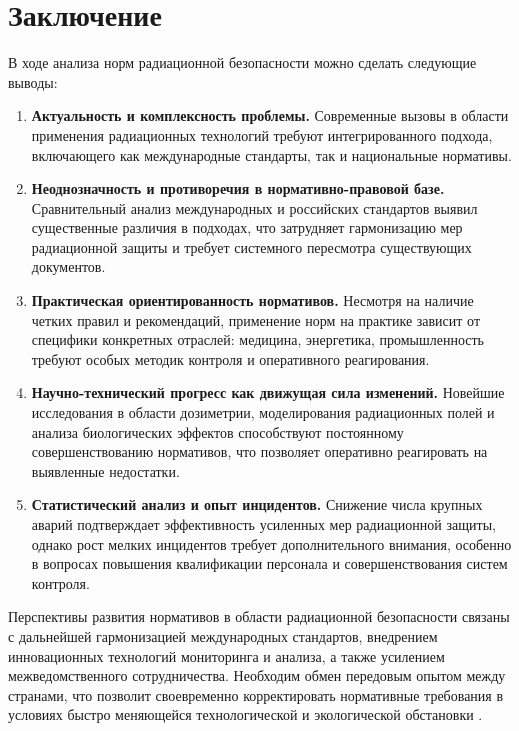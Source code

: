 \documentclass[a4paper, 14pt]{extarticle}
\begin{document}
\section{Заключение}

В ходе анализа норм радиационной безопасности можно сделать следующие выводы:

\begin{enumerate}
    \item \textbf{Актуальность и комплексность проблемы.} Современные вызовы в области применения радиационных технологий требуют интегрированного подхода, включающего как международные стандарты, так и национальные нормативы.

    \item \textbf{Неоднозначность и противоречия в нормативно-правовой базе.} Сравнительный анализ международных и российских стандартов выявил существенные различия в подходах, что затрудняет гармонизацию мер радиационной защиты и требует системного пересмотра существующих документов.

    \item \textbf{Практическая ориентированность нормативов.} Несмотря на наличие четких правил и рекомендаций, применение норм на практике зависит от специфики конкретных отраслей: медицина, энергетика, промышленность требуют особых методик контроля и оперативного реагирования.

    \item \textbf{Научно-технический прогресс как движущая сила изменений.} Новейшие исследования в области дозиметрии, моделирования радиационных полей и анализа биологических эффектов способствуют постоянному совершенствованию нормативов, что позволяет оперативно реагировать на выявленные недостатки.

    \item \textbf{Статистический анализ и опыт инцидентов.} Снижение числа крупных аварий подтверждает эффективность усиленных мер радиационной защиты, однако рост мелких инцидентов требует дополнительного внимания, особенно в вопросах повышения квалификации персонала и совершенствования систем контроля.
\end{enumerate}

Перспективы развития нормативов в области радиационной безопасности связаны с дальнейшей гармонизацией международных стандартов, внедрением инновационных технологий мониторинга и анализа, а также усилением межведомственного сотрудничества. Необходим обмен передовым опытом между странами, что позволит своевременно корректировать нормативные требования в условиях быстро меняющейся технологической и экологической обстановки \cite{4,11}.
\end{document}
